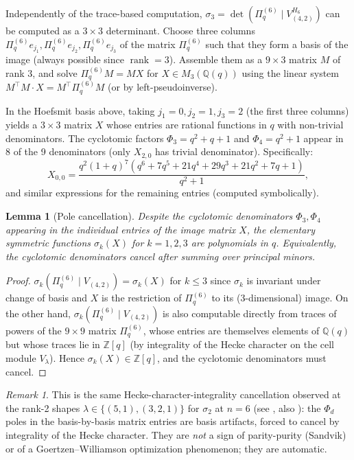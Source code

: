 \documentclass[11pt]{article}
\theoremstyle{plain}
\newtheorem{lemma}[theorem]{Lemma}
\theoremstyle{definition}
\theoremstyle{remark}
\newtheorem{remark}[theorem]{Remark}
\newcommand{\Z}{\mathbb{Z}}
\newcommand{\Q}{\mathbb{Q}}
\newcommand{\Pibs}{\Pi_q}
\newcommand{\rank}{\operatorname{rank}}
\begin{document}
Independently of the trace-based computation, $\sigma_3 = \det(\Pibs^{(6)} \mid V_{(4,2)}^{H_6})$
can be computed as a $3 \times 3$ determinant. Choose three columns
$\Pibs^{(6)} e_{j_1}, \Pibs^{(6)} e_{j_2}, \Pibs^{(6)} e_{j_3}$ of the matrix
$\Pibs^{(6)}$ such that they form a basis of the image (always possible since
$\rank = 3$). Assemble them as a $9 \times 3$ matrix $M$ of rank 3, and
solve $\Pibs^{(6)} M = M X$ for $X \in M_3(\Q(q))$ using the linear system
$M^\top M \cdot X = M^\top \Pibs^{(6)} M$ (or by left-pseudoinverse).

In the Hoefsmit basis above, taking $j_1 = 0, j_2 = 1, j_3 = 2$ (the first
three columns) yields a $3 \times 3$ matrix $X$ whose entries are rational
functions in $q$ with non-trivial denominators. The cyclotomic
factors $\Phi_3 = q^2 + q + 1$ and $\Phi_4 = q^2 + 1$ appear in 8 of the 9
denominators (only $X_{2,0}$ has trivial denominator). Specifically:
\[
X_{0,0} = \frac{q^2(1+q)^7(q^6 + 7q^5 + 21q^4 + 29q^3 + 21q^2 + 7q + 1)}{q^2 + 1},
\]
and similar expressions for the remaining entries (computed symbolically).

\begin{lemma}[Pole cancellation]\label{lem:pole-cancellation}
Despite the cyclotomic denominators $\Phi_3, \Phi_4$ appearing in the
individual entries of the image matrix $X$, the elementary symmetric
functions $\sigma_k(X)$ for $k = 1, 2, 3$ are polynomials in $q$. Equivalently,
the cyclotomic denominators cancel after summing over principal minors.
\end{lemma}

\begin{proof}
$\sigma_k(\Pibs^{(6)} \mid V_{(4,2)}) = \sigma_k(X)$ for $k \leq 3$ since
$\sigma_k$ is invariant under change of basis and $X$ is the restriction
of $\Pibs^{(6)}$ to its (3-dimensional) image. On the other hand,
$\sigma_k(\Pibs^{(6)} \mid V_{(4,2)})$ is also computable directly from
traces of powers of the $9 \times 9$ matrix $\Pibs^{(6)}$, whose entries
are themselves elements of $\Q(q)$ but whose traces lie in $\Z[q]$ (by
integrality of the Hecke character on the cell module $V_\lambda$). Hence
$\sigma_k(X) \in \Z[q]$, and the cyclotomic denominators must cancel.
\end{proof}

\begin{remark}
This is the same Hecke-character-integrality cancellation observed at the
rank-2 shapes $\lambda \in \{(5,1), (3,2,1)\}$ for $\sigma_2$ at $n = 6$
(see \cite{2026-04-25-sigma2-G1-n6}, also \cite{2026-04-26-phi4-artifact}):
the $\Phi_d$ poles in the basis-by-basis matrix entries are basis artifacts,
forced to cancel by integrality of the Hecke character. They are
\emph{not} a sign of parity-purity (Sandvik) or of a Goertzen--Williamson
optimization phenomenon; they are automatic.
\end{remark}
\end{document}
